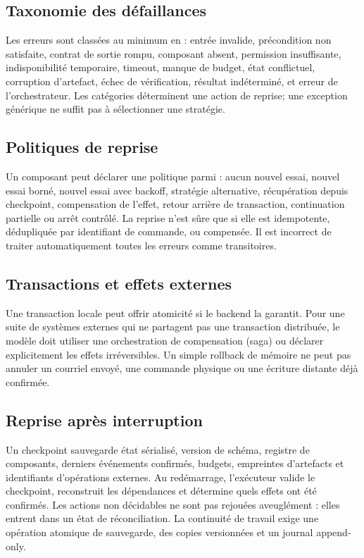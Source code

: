 \documentclass[11pt,a4paper]{article}
\theoremstyle{definition}
\theoremstyle{plain}
\theoremstyle{remark}
\begin{document}
\subsection{Taxonomie des défaillances}
Les erreurs sont classées au minimum en : entrée invalide, précondition non satisfaite, contrat de sortie rompu, composant absent, permission insuffisante, indisponibilité temporaire, timeout, manque de budget, état conflictuel, corruption d'artefact, échec de vérification, résultat indéterminé, et erreur de l'orchestrateur. Les catégories déterminent une action de reprise; une exception générique ne suffit pas à sélectionner une stratégie.

\subsection{Politiques de reprise}
Un composant peut déclarer une politique parmi : aucun nouvel essai, nouvel essai borné, nouvel essai avec backoff, stratégie alternative, récupération depuis checkpoint, compensation de l'effet, retour arrière de transaction, continuation partielle ou arrêt contrôlé. La reprise n'est sûre que si elle est idempotente, dédupliquée par identifiant de commande, ou compensée. Il est incorrect de traiter automatiquement toutes les erreurs comme transitoires.

\subsection{Transactions et effets externes}
Une transaction locale peut offrir atomicité si le backend la garantit. Pour une suite de systèmes externes qui ne partagent pas une transaction distribuée, le modèle doit utiliser une orchestration de compensation (saga) ou déclarer explicitement les effets irréversibles. Un simple rollback de mémoire ne peut pas annuler un courriel envoyé, une commande physique ou une écriture distante déjà confirmée.

\subsection{Reprise après interruption}
Un checkpoint sauvegarde état sérialisé, version de schéma, registre de composants, derniers événements confirmés, budgets, empreintes d'artefacts et identifiants d'opérations externes. Au redémarrage, l'exécuteur valide le checkpoint, reconstruit les dépendances et détermine quels effets ont été confirmés. Les actions non décidables ne sont pas rejouées aveuglément : elles entrent dans un état de réconciliation. La continuité de travail exige une opération atomique de sauvegarde, des copies versionnées et un journal append-only.
\end{document}
